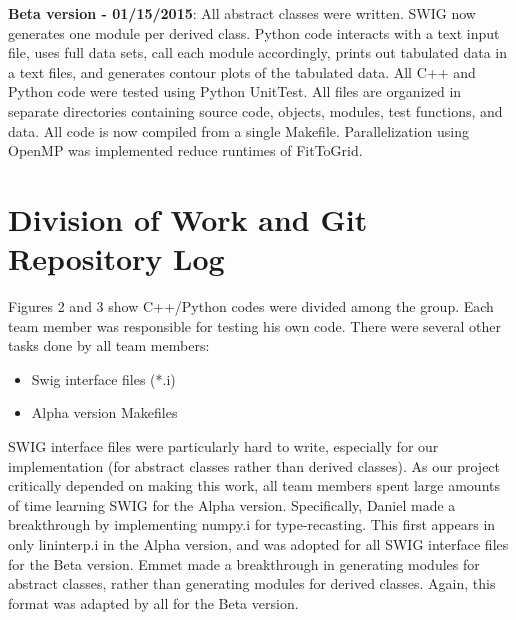 \documentclass[11pt]{article}
\begin{document}
\textbf{Beta version - 01/15/2015}: All abstract classes were written. SWIG now generates one module per derived class. Python code interacts with a text input file, uses full data sets, call each module accordingly, prints out tabulated data in a text files, and generates contour plots of the tabulated data. All C++ and Python code were tested using Python UnitTest. All files are organized in separate directories containing source code, objects, modules, test functions, and data. All code is now compiled from a single Makefile. Parallelization using OpenMP was implemented reduce runtimes of FitToGrid.


\section{Division of Work and Git Repository Log}
Figures 2 and 3 show C++/Python codes were divided among the group. Each team member was responsible for testing his own code. There were several other tasks done by all team members:
\begin{itemize}
\item Swig interface files (*.i)
\item Alpha version Makefiles
\end{itemize}
SWIG interface files were particularly hard to write, especially for our implementation (for abstract classes rather than derived classes). As our project critically depended on making this work, all team members spent large amounts of time learning SWIG for the Alpha version. Specifically, Daniel made a breakthrough by implementing numpy.i for type-recasting. This first appears in only lininterp.i in the Alpha version, and was adopted for all SWIG interface files for the Beta version. Emmet made a breakthrough in generating modules for abstract classes, rather than generating modules for derived classes. Again, this format was adapted by all for the Beta version. 
\end{document}
